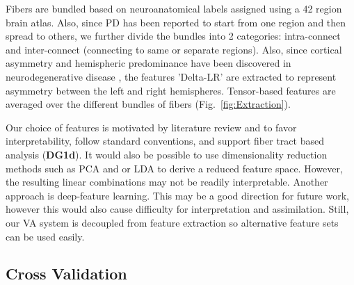 Fibers are bundled based on neuroanatomical labels assigned using a 42 region brain atlas. Also, since PD has been reported to start from one region and then spread to others, 
we further divide the bundles into 2 categories: intra-connect and inter-connect (connecting to same or separate regions). Also, since cortical asymmetry and hemispheric predominance have been discovered in neurodegenerative disease \cite{scherfler2012left}, the features 'Delta-LR' are extracted to represent asymmetry between the left and right hemispheres. Tensor-based features are averaged over the different bundles of fibers (Fig.~\ref{fig:Extraction}).

Our choice of features is motivated by literature review and to favor interpretability, follow standard conventions, and support fiber tract based analysis (\textbf{DG1d}). It would also be possible to use dimensionality reduction methods such as PCA and or LDA to derive a reduced feature space. However, the resulting linear combinations may not be readily interpretable. Another approach is deep-feature learning. This may be a good direction for future work, however this would also cause difficulty for interpretation and assimilation. Still, our VA system is decoupled from feature extraction so alternative feature sets can be used easily. 




\subsection{Cross Validation}
\label{sec:CrossValidation}

